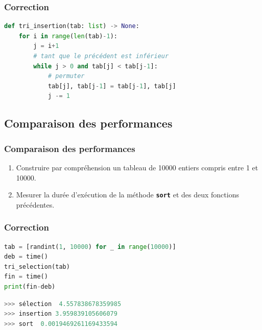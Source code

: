 \documentclass[svgnames,11pt]{beamer}
\begin{document}
\begin{frame}[fragile]
    \frametitle{Correction}

    \begin{center}
        \begin{lstlisting}[language=Python , basicstyle=\ttfamily\small, xleftmargin=1em, xrightmargin=1em]
def tri_insertion(tab: list) -> None:
    for i in range(len(tab)-1):
        j = i+1
        # tant que le précédent est inférieur
        while j > 0 and tab[j] < tab[j-1]:
            # permuter
            tab[j], tab[j-1] = tab[j-1], tab[j]
            j -= 1
\end{lstlisting}
    \end{center}
\end{frame}
\subsection{Comparaison des performances}
\begin{frame}
    \frametitle{Comparaison des performances}
    \begin{activite}
        \begin{enumerate}
            \item Construire par compréhension un tableau de 10000 entiers compris entre 1 et 10000.
            \item Mesurer la durée d'exécution de la méthode \textbf{\texttt{sort}} et des deux fonctions précédentes.
        \end{enumerate}
    \end{activite}
\end{frame}
\begin{frame}[fragile]
    \frametitle{Correction}

    \begin{center}
        \begin{lstlisting}[language=Python , basicstyle=\ttfamily\small, xleftmargin=2em, xrightmargin=2em]
tab = [randint(1, 10000) for _ in range(10000)]
deb = time()
tri_selection(tab)
fin = time()
print(fin-deb)
\end{lstlisting}
        \label{CODE}
    \end{center}
    \begin{center}
        \begin{lstlisting}[language=Python , basicstyle=\ttfamily\small, xleftmargin=2em, xrightmargin=2em]
>>> sélection  4.557838678359985
>>> insertion 3.959839105606079
>>> sort  0.0019469261169433594
\end{lstlisting}
        \label{CODE}
    \end{center}
\end{frame}
\end{document}
